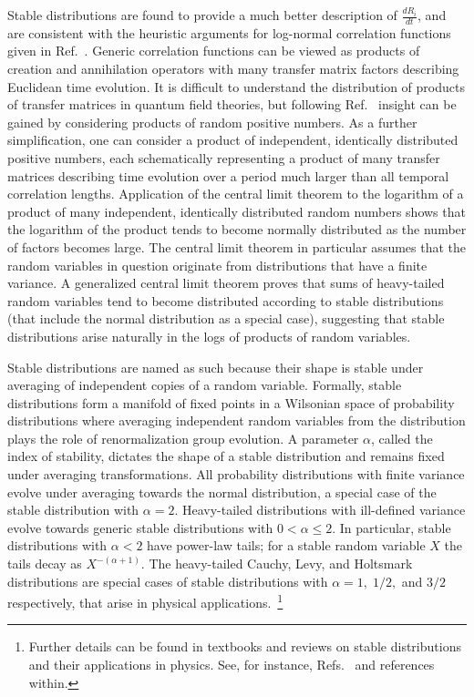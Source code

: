 Stable distributions are found to provide a much better description of $\frac{dR_i}{dt}$, and are  consistent with the heuristic arguments 
for log-normal correlation functions given in Ref.~\cite{Endres:2011jm}. 
Generic correlation functions can be viewed as products of creation and annihilation operators with many transfer matrix factors 
describing Euclidean time evolution. 
It is difficult to understand the distribution of products of transfer matrices in quantum field theories, 
but following Ref.~\cite{Endres:2011jm} insight can be gained by considering products of random positive numbers.
As a further simplification, one can consider a product of independent, identically distributed positive numbers, each schematically representing a product of many transfer matrices describing time evolution over a period much larger than all temporal correlation lengths.
Application of the central limit theorem to the logarithm of a product of many independent, identically distributed 
random numbers shows that the logarithm of the product tends to become normally distributed as the number of 
factors becomes large. 
The central limit theorem in particular assumes that the random variables in question 
originate from distributions that have a finite variance.
A generalized central limit theorem proves that sums of heavy-tailed random 
variables tend to become distributed according to stable distributions (that 
include the normal distribution as a special case), 
suggesting that
 stable distributions arise naturally in the logs of products of random variables.



Stable distributions are named as such because their shape is stable under averaging of independent copies of a random variable. 
Formally, stable distributions form a manifold of fixed points in a Wilsonian space of probability distributions where averaging 
independent random variables from the distribution plays the role of renormalization group evolution. 
A parameter $\alpha$, called the index of stability, dictates the shape of a stable distribution and remains fixed under averaging transformations. 
All probability distributions with finite variance evolve under averaging towards the normal distribution, 
a special case of the stable distribution with $\alpha = 2$. 
Heavy-tailed distributions with ill-defined variance evolve towards generic stable distributions with $0 < \alpha \leq 2$. 
In particular, stable distributions with $\alpha < 2$ have power-law tails; 
for a stable random variable $X$ the tails decay as $X^{-(\alpha + 1)}$. 
The heavy-tailed Cauchy, Levy, and Holtsmark distributions are special cases of stable distributions with $\alpha = 1,\;1/2,$ and $3/2$ respectively,
that arise in physical applications.~\footnote{
Further details can be found in  textbooks and reviews on stable distributions and their applications in physics. 
See, for instance, Refs.~\cite{Chandrasekhar:1943,Bouchaud:1990,Bardou:2000,Voit:2005,Nolan:2015} and references within.
}



